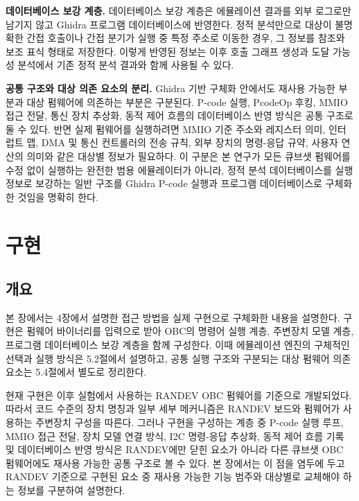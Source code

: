 \documentclass[master,korean,final]{kaist-ucs}
\begin{document}
\noindent\textbf{데이터베이스 보강 계층.}
데이터베이스 보강 계층은 에뮬레이션 결과를 외부 로그로만 남기지 않고 Ghidra 프로그램 데이터베이스에 반영한다. 정적 분석만으로 대상이 불명확한 간접 호출이나 간접 분기가 실행 중 특정 주소로 이동한 경우, 그 정보를 참조와 보조 표식 형태로 저장한다. 이렇게 반영된 정보는 이후 호출 그래프 생성과 도달 가능성 분석에서 기존 정적 분석 결과와 함께 사용될 수 있다.

\noindent\textbf{공통 구조와 대상 의존 요소의 분리.}
Ghidra 기반 구체화 안에서도 재사용 가능한 부분과 대상 펌웨어에 의존하는 부분은 구분된다. P-code 실행, PcodeOp 후킹, MMIO 접근 전달, 통신 장치 추상화, 동적 제어 흐름의 데이터베이스 반영 방식은 공통 구조로 둘 수 있다. 반면 실제 펌웨어를 실행하려면 MMIO 기준 주소와 레지스터 의미, 인터럽트 맵, DMA 및 통신 컨트롤러의 전송 규칙, 외부 장치의 명령-응답 규약, 사용자 연산의 의미와 같은 대상별 정보가 필요하다. 이 구분은 본 연구가 모든 큐브샛 펌웨어를 수정 없이 실행하는 완전한 범용 에뮬레이터가 아니라, 정적 분석 데이터베이스를 실행 정보로 보강하는 일반 구조를 Ghidra P-code 실행과 프로그램 데이터베이스로 구체화한 것임을 명확히 한다.

\chapter{구현}

\section{개요}

본 장에서는 4장에서 설명한 접근 방법을 실제 구현으로 구체화한 내용을 설명한다. 구현은 펌웨어 바이너리를 입력으로 받아 OBC의 명령어 실행 계층, 주변장치 모델 계층, 프로그램 데이터베이스 보강 계층을 함께 구성한다. 이때 에뮬레이션 엔진의 구체적인 선택과 실행 방식은 5.2절에서 설명하고, 공통 실행 구조와 구분되는 대상 펌웨어 의존 요소는 5.4절에서 별도로 정리한다.

현재 구현은 이후 실험에서 사용하는 RANDEV OBC 펌웨어를 기준으로 개발되었다. 따라서 코드 수준의 장치 명칭과 일부 세부 메커니즘은 RANDEV 보드와 펌웨어가 사용하는 주변장치 구성을 따른다. 그러나 구현을 구성하는 계층 중 P-code 실행 루프, MMIO 접근 전달, 장치 모델 연결 방식, I2C 명령-응답 추상화, 동적 제어 흐름 기록 및 데이터베이스 반영 방식은 RANDEV에만 닫힌 요소가 아니라 다른 큐브샛 OBC 펌웨어에도 재사용 가능한 공통 구조로 볼 수 있다. 본 장에서는 이 점을 염두에 두고 RANDEV 기준으로 구현된 요소 중 재사용 가능한 기능 범주와 대상별로 교체해야 하는 정보를 구분하여 설명한다.
\end{document}
